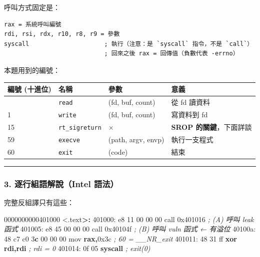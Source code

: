 \documentclass[10pt,a4paper]{article}
\newcounter{none}
\newenvironment{Shaded}{\begin{snugshade}}{\end{snugshade}}
\newcommand{\BaseNTok}[1]{\textcolor[rgb]{0.00,0.00,0.81}{#1}}
\newcommand{\CommentTok}[1]{\textcolor[rgb]{0.56,0.35,0.01}{\textit{#1}}}
\newcommand{\ControlFlowTok}[1]{\textcolor[rgb]{0.13,0.29,0.53}{\textbf{#1}}}
\newcommand{\DecValTok}[1]{\textcolor[rgb]{0.00,0.00,0.81}{#1}}
\newcommand{\ErrorTok}[1]{\textcolor[rgb]{0.64,0.00,0.00}{\textbf{#1}}}
\newcommand{\KeywordTok}[1]{\textcolor[rgb]{0.13,0.29,0.53}{\textbf{#1}}}
\newcommand{\NormalTok}[1]{#1}
\newcommand{\OperatorTok}[1]{\textcolor[rgb]{0.81,0.36,0.00}{\textbf{#1}}}
\renewenvironment{Shaded}{%
  \def\FrameCommand{\fboxsep=3.2pt\colorbox{shadecolor}}%
  \MakeFramed{\advance\hsize-\width\FrameRestore\small}%
}{%
  \endMakeFramed
}
\begin{document}
呼叫方式固定是：

\begin{Verbatim}[breaklines=true,breakanywhere=true,breakautoindent=false,fontsize=\fontsize{7.0}{9.5}\selectfont]
rax = 系統呼叫編號
rdi, rsi, rdx, r10, r8, r9 = 參數
syscall                     ; 執行（注意：是 `syscall` 指令，不是 `call`）
                            ; 回來之後 rax = 回傳值（負數代表 -errno）
\end{Verbatim}

本題用到的編號：

{\def\LTcaptype{none} %
\begin{longtable}[]{@{}llll@{}}
\toprule\noalign{}
編號 (十進位) & 名稱 & 參數 & 意義 \\
\midrule\noalign{}
\endhead
\bottomrule\noalign{}
\endlastfoot
0 & \texttt{read} & (fd, buf, count) & 從 fd 讀資料 \\
1 & \texttt{write} & (fd, buf, count) & 寫資料到 fd \\
15 & \texttt{rt\_\allowbreak{}sigreturn} & × & \textbf{SROP 的關鍵}，下面詳談 \\
59 & \texttt{execve} & (path, argv, envp) & 執行一支程式 \\
60 & \texttt{exit} & (code) & 結束 \\
\end{longtable}
}

\begin{center}\rule{0.5\linewidth}{0.5pt}\end{center}

\subsubsection{3. 逐行組語解說（Intel
語法）}\label{ux9010ux884cux7d44ux8a9eux89e3ux8aaaintel-ux8a9eux6cd5}

完整反組譯只有這些：

\begin{Shaded}
\begin{Highlighting}[]
\NormalTok{0000000000401000 \textless{}.text}\OperatorTok{\textgreater{}:}
\NormalTok{  401000:  e8 }\DecValTok{11} \DecValTok{00} \DecValTok{00} \DecValTok{00}\NormalTok{        call   }\BaseNTok{0x401016}     \CommentTok{; (A) 呼叫 leak 函式}
\NormalTok{  401005:  e8 }\DecValTok{45} \DecValTok{00} \DecValTok{00} \DecValTok{00}\NormalTok{        call   }\BaseNTok{0x40104f}     \CommentTok{; (B) 呼叫 vuln 函式  ← 有溢位}
\NormalTok{  40100a:  48 c7 c0 }\DecValTok{3}\ErrorTok{c} \DecValTok{00} \DecValTok{00} \DecValTok{00}\NormalTok{  mov    }\KeywordTok{rax}\OperatorTok{,}\BaseNTok{0x3c}     \CommentTok{; 60 = \_\_NR\_exit}
\NormalTok{  401011:  48 31 ff              }\OperatorTok{xor}    \KeywordTok{rdi}\OperatorTok{,}\KeywordTok{rdi}      \CommentTok{; rdi = 0}
\NormalTok{  401014:  0f 05                 }\ControlFlowTok{syscall}               \CommentTok{; exit(0)}
\end{Highlighting}
\end{Shaded}
\end{document}
